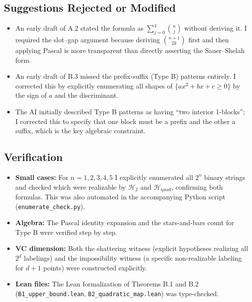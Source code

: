 \documentclass{article}
\begin{document}
\subsection{Suggestions Rejected or Modified}
 
\begin{itemize}
  \item An early draft of A.2 stated the formula as $\sum_{j=0}^{4}\binom{n}{j}$
    without deriving it.  I required the slot--gap argument because deriving
    $\binom{n+1}{2k}$ first and then applying Pascal is more transparent than
    directly asserting the Sauer--Shelah form.
 
  \item An early draft of B.3 missed the prefix-suffix (Type B) patterns
    entirely.  I corrected this by explicitly enumerating all shapes of
    $\{ax^2+bx+c\ge0\}$ by the sign of $a$ and the discriminant.
 
  \item The AI initially described Type B patterns as having ``two interior
    1-blocks''; I corrected this to specify that one block must be a prefix
    and the other a suffix, which is the key algebraic constraint.
\end{itemize}
 
\subsection{Verification}
 
\begin{itemize}
  \item \textbf{Small cases:} For $n=1,2,3,4,5$ I explicitly enumerated all
    $2^n$ binary strings and checked which were realizable by $\mathcal{H}_2$
    and $\mathcal{H}_{\mathrm{quad}}$, confirming both formulas.  This was
    also automated in the accompanying Python script
    (\texttt{enumerate\_check.py}).
 
  \item \textbf{Algebra:} The Pascal identity expansion and the stars-and-bars
    count for Type B were verified step by step.
 
  \item \textbf{VC dimension:} Both the shattering witness (explicit
    hypotheses realizing all $2^d$ labelings) and the impossibility witness
    (a specific non-realizable labeling for $d+1$ points) were constructed
    explicitly.
 
  \item \textbf{Lean files:} The Lean formalization of Theorems B.1 and B.2
    (\texttt{B1\_upper\_bound.lean}, \texttt{B2\_quadratic\_map.lean}) was
    type-checked.
\end{itemize}
 
\end{document}
